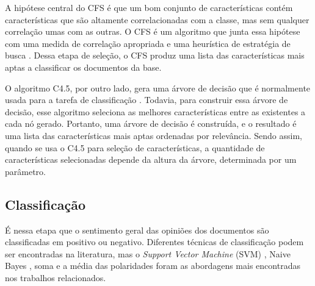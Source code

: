 \documentclass[template.tex]{subfiles}
\begin{document}


A hipótese central do CFS é que um bom conjunto de características contém características que são altamente correlacionadas com a classe, mas sem qualquer correlação umas com as outras. O CFS é um algoritmo que junta essa hipótese com uma medida de correlação apropriada e uma heurística de estratégia de busca \cite{hall1999correlation}. Dessa etapa de seleção, o CFS produz uma lista das características mais aptas a classificar os documentos da base. 

O algoritmo C4.5, por outro lado, gera uma árvore de decisão que é normalmente usada para a tarefa de classificação \cite{quinlan19934}. Todavia, para construir essa árvore de decisão, esse algoritmo seleciona as melhores características entre as existentes a cada nó gerado. Portanto, uma árvore de decisão é construída, e o resultado é uma lista das características mais aptas ordenadas por relevância. Sendo assim, quando se usa o C4.5 para seleção de características, a quantidade de características selecionadas depende da altura da árvore, determinada por um parâmetro.

\subsection{Classificação}

%
%
%
%
%

É nessa etapa que o sentimento geral das opiniões dos documentos são classificadas em positivo ou negativo. Diferentes técnicas de classificação podem ser encontradas na literatura, mas o \textit{Support Vector Machine} (SVM) \cite{pang2002thumbs, pang2004sentimental, tsutsumi2007movie, prabowo2009sentiment}, Naive Bayes \cite{pang2002thumbs, pang2004sentimental}, soma \cite{ohana2011domain, avancco2014lexicon} e a média \cite{turney2002thumbs, voll2007not, taboada2008extracting, taboada2011lexicon} das polaridades foram as abordagens mais encontradas nos trabalhos relacionados.
\end{document}
